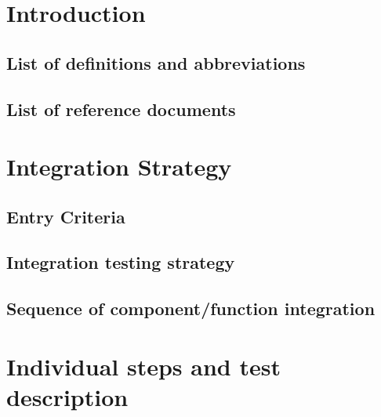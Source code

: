 \documentclass{../Common/Structure/doc_pdf}
\begin{document}
\titleToc
\newcommand{\testCase}[7]{%
	\unbreakableBlock{%
		\vspace{0.5em}
		\paragraphnewline{Test Case I#1}
		\newline
		\begin{tabulary}{\linewidth}{Y{3cm}|X{8.25cm}}
			\textbf{Test Item(s)} & #2 $\longleftrightarrow$ #3 \\ \hline
			\textbf{Input Specification} & #4 \\ \hline
			\textbf{Output Specification} & #5 \\ \hline
			\textbf{Environmental Needs} & #6 \\ \hline
			\textbf{Target} & #7 \\
		\end{tabulary}
		\vspace{0.5em}%
	}%
}
\chapter{Introduction}

\section{List of definitions and abbreviations}

\section{List of reference documents}

\newpage

\chapter{Integration Strategy}
\section{Entry Criteria}

\section{Integration testing strategy}

\section{Sequence of component/function integration}


\chapter{Individual steps and test description}

\end{document}
